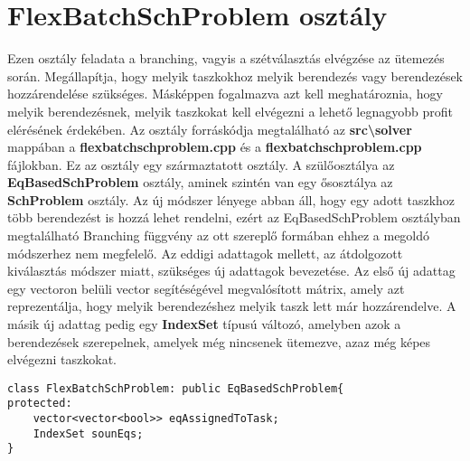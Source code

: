 \section{FlexBatchSchProblem osztály}
Ezen osztály feladata a branching, vagyis a szétválasztás elvégzése az ütemezés során. Megállapítja, hogy melyik taszkokhoz melyik berendezés vagy berendezések hozzárendelése szükséges. Másképpen fogalmazva azt kell meghatároznia, hogy melyik berendezésnek, melyik taszkokat kell elvégezni a lehető legnagyobb profit elérésének érdekében. Az osztály forráskódja megtalálható az \textbf{src\textbackslash solver} mappában a \textbf{flexbatchschproblem.cpp} és a \textbf{flexbatchschproblem.cpp} fájlokban. Ez az osztály egy származtatott osztály. A szülőosztálya az \textbf{EqBasedSchProblem} osztály, aminek szintén van egy ősosztálya az \textbf{SchProblem} osztály. Az új módszer lényege abban áll, hogy egy adott taszkhoz több berendezést is hozzá lehet rendelni, ezért az EqBasedSchProblem osztályban megtalálható Branching függvény az ott szereplő formában ehhez a megoldó módszerhez nem megfelelő. Az eddigi adattagok mellett, az átdolgozott kiválasztás módszer miatt, szükséges új adattagok bevezetése. Az első új adattag egy vectoron belüli vector segítéségével megvalósított mátrix, amely azt reprezentálja, hogy melyik berendezéshez melyik taszk lett már hozzárendelve. A másik új adattag pedig egy \textbf{IndexSet} típusú változó, amelyben azok a berendezések szerepelnek, amelyek még nincsenek ütemezve, azaz még képes elvégezni taszkokat.
\begin{lstlisting}[caption={FlexBatchSchProblem osztály adattagjai}]
class FlexBatchSchProblem: public EqBasedSchProblem{
protected:
	vector<vector<bool>> eqAssignedToTask;
    IndexSet sounEqs;
}
\end{lstlisting}
